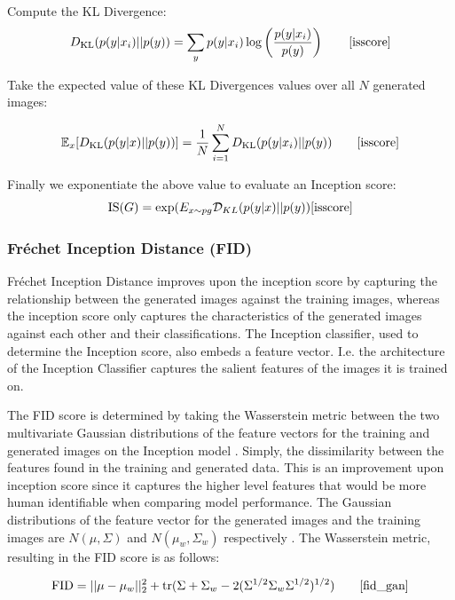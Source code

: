 \documentclass[%
 reprint,
 amsmath,amssymb,
 aps,
]{revtex4-2}
\begin{document}
Compute the KL Divergence:
\begin{equation}
    D_{\text{KL}}(p(y|x_i) || p(y)) = \sum_{y} p(y|x_i) \log \left( \frac{p(y|x_i)}{p(y)} \right)\qquad
    \cite{isscore}
\end{equation}

Take the expected value of these KL Divergences values over all $N$ generated images:

\begin{equation}
    \mathbb{E}_{x}[D_{\text{KL}}(p(y|x) || p(y))] = \frac{1}{N} \sum_{i=1}^{N} D_{\text{KL}}(p(y|x_i) || p(y))\qquad
\cite{isscore}
\end{equation}

Finally we exponentiate the above value to evaluate an Inception score:
\begin{equation}
\text{IS}(G) = \exp (E_{x\sim pg} \mathcal{D}_{KL}( p(y|x) || p(y) )
\cite{isscore}
\end{equation}

\subsubsection{Fréchet Inception Distance (FID)}
Fréchet Inception Distance improves upon the inception score by capturing the relationship between the generated images against the training images, whereas the inception score only captures the characteristics of the generated images against each other and their classifications. The Inception classifier, used to determine the Inception score, also embeds a feature vector. I.e. the architecture of the Inception Classifier captures the salient features of the images it is trained on.



The FID score is determined by taking the Wasserstein metric between the two multivariate Gaussian distributions of the feature vectors for the training and generated images on the Inception model \cite{NIPS2017_8a1d6947}. Simply, the dissimilarity between the features found in the training and generated data. This is an improvement upon inception score since it captures the higher level features that would be more human identifiable when comparing model performance. The Gaussian distributions of the feature vector for the generated images and the training images are $N(\mu, \Sigma)$ and $N(\mu_w, \Sigma_w)$ respectively \cite{fid_gan}. The Wasserstein metric, resulting in the FID score is as follows:

\begin{equation}
\text{FID}=||\mu -\mu _{w}||_{2}^{2}+\operatorname {tr} (\Sigma +\Sigma _{w}-2(\Sigma ^{1/2}\Sigma _{w}\Sigma ^{1/2})^{1/2})\qquad
\cite{fid_gan}
\end{equation}
\end{document}
